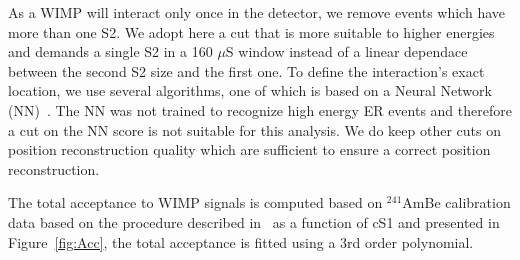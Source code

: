As a WIMP will interact only once in the detector, we remove events which have more than one S2. We adopt here a cut that is more suitable to higher energies and demands a single S2 in a 160 $\mu$S window instead of a linear dependace between the second S2 size and the first one. To define the interaction's exact location, we use several algorithms, one of which is based on a Neural Network (NN)~\cite{Aprile:2012vw}. The NN was not trained to recognize high energy ER events and therefore a cut on the NN score is not suitable for this analysis. We do keep other cuts on position reconstruction quality which are sufficient to ensure a correct position reconstruction. 

The total acceptance to WIMP signals is computed based on $^{241}$AmBe calibration data based on  the procedure described in~\cite{Aprile:2012vw} as a function of cS1
 and presented  in Figure~\ref{fig:Acc}, the total acceptance is fitted using a 3rd order polynomial.


